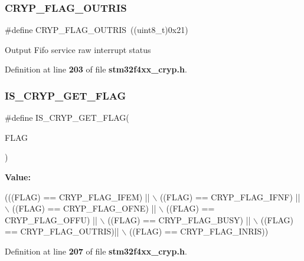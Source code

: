 \subsubsection{C\+R\+Y\+P\+\_\+\+F\+L\+A\+G\+\_\+\+O\+U\+T\+R\+IS}
{\footnotesize\ttfamily \#define C\+R\+Y\+P\+\_\+\+F\+L\+A\+G\+\_\+\+O\+U\+T\+R\+IS~((uint8\+\_\+t)0x21)}

Output Fifo service raw interrupt status 

Definition at line \textbf{ 203} of file \textbf{ stm32f4xx\+\_\+cryp.\+h}.

\mbox{\label{group__CRYP__flags__definition_ga6d7454a0f4ff5bf286cc9dff95f6e849}} 
\subsubsection{I\+S\+\_\+\+C\+R\+Y\+P\+\_\+\+G\+E\+T\+\_\+\+F\+L\+AG}
{\footnotesize\ttfamily \#define I\+S\+\_\+\+C\+R\+Y\+P\+\_\+\+G\+E\+T\+\_\+\+F\+L\+AG(\begin{DoxyParamCaption}\item[{}]{F\+L\+AG }\end{DoxyParamCaption})}

{\bfseries Value\+:}
\begin{DoxyCode}
(((FLAG) == CRYP_FLAG_IFEM)  || \(\backslash\)
                                ((FLAG) == CRYP_FLAG_IFNF)  || \(\backslash\)
                                ((FLAG) == CRYP_FLAG_OFNE)  || \(\backslash\)
                                ((FLAG) == CRYP_FLAG_OFFU)  || \(\backslash\)
                                ((FLAG) == CRYP_FLAG_BUSY)  || \(\backslash\)
                                ((FLAG) == CRYP_FLAG_OUTRIS)|| \(\backslash\)
                                ((FLAG) == CRYP_FLAG_INRIS))
\end{DoxyCode}


Definition at line \textbf{ 207} of file \textbf{ stm32f4xx\+\_\+cryp.\+h}.

